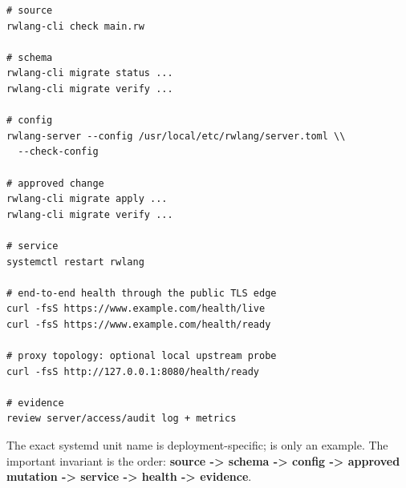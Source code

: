 \begin{lstlisting}
# source
rwlang-cli check main.rw

# schema
rwlang-cli migrate status ...
rwlang-cli migrate verify ...

# config
rwlang-server --config /usr/local/etc/rwlang/server.toml \\
  --check-config

# approved change
rwlang-cli migrate apply ...
rwlang-cli migrate verify ...

# service
systemctl restart rwlang

# end-to-end health through the public TLS edge
curl -fsS https://www.example.com/health/live
curl -fsS https://www.example.com/health/ready

# proxy topology: optional local upstream probe
curl -fsS http://127.0.0.1:8080/health/ready

# evidence
review server/access/audit log + metrics
\end{lstlisting}

The exact systemd unit name is deployment-specific;  is only an example. The important invariant is the order: \textbf{source -> schema -> config -> approved mutation -> service -> health -> evidence}.
